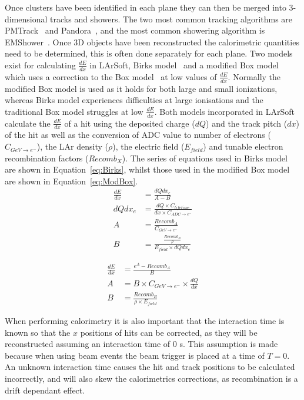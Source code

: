 Once clusters have been identified in each plane they can then be merged into 3-dimensional tracks and showers. The two most common tracking algorithms are PMTrack~\citep{PMTrack} and Pandora~\citep{Pandora}, and the most common showering algorithm is EMShower~\citep{EMShower}. Once 3D objects have been reconstructed the calorimetric quantities need to be determined, this is often done separately for each plane. Two models exist for calculating $\frac{dE}{dx}$ in LArSoft, Birks model~\citep{BirksModel} and a modified Box model~\citep{PIDA_Paper} which uses a correction to the Box model~\citep{BoxModel} at low values of $\frac{dE}{dx}$. Normally the modified Box model is used as it holds for both large and small ionizations, whereas Birks model experiences difficulties at large ionisations and the traditional Box model struggles at low $\frac{dE}{dx}$. Both models incorporated in LArSoft calculate the $\frac{dE}{dx}$ of a hit using the deposited charge ($dQ$) and the track pitch ($dx$) of the hit as well as the conversion of ADC value to number of electrons ($C_{GeV \rightarrow e^{-}}$), the LAr density ($\rho$), the electric field ($E_{field}$) and tunable electron recombination factors ($Recomb_{X}$). The series of equations used in Birks model are shown in Equation~\ref{eq:Birks}, whilst those used in the modified Box model are shown in Equation~\ref{eq:ModBox}. \\

\begin{subequations}\begin{align}
    \frac{dE}{dx} &= \frac{ dQdx_{e} }{ A - B } \label{eq:Birks} \\
    dQdx_{e} &= \frac{ dQ \times C_{lifetime} }{ dx \times C_{ADC \rightarrow e^{-}} } \\
    A &= \frac{ Recomb_{A} }{ C_{GeV \rightarrow e^{-}} } \label{eq:Birks_A}\\
    B &= \frac{ \frac{Recomb_{B}}{\rho} }{ E_{field} \times dQdx_{e} } \label{eq:Birks_B}
\end{align}\end{subequations}

\begin{subequations}\begin{align}
    \frac{dE}{dx} &= \frac{ e^{A} - Recomb_{A} }{ B } \label{eq:ModBox} \\
    A &= B \times C_{GeV \rightarrow e^{-}} \times \frac{dQ}{dx} \label{eq:ModBox_A}\\
    B &= \frac{ Recomb_{B} }{ \rho \times E_{field} } \label{eq:ModBox_B}
\end{align}\end{subequations}

When performing calorimetry it is also important that the interaction time is known so that the $x$ positions of hits can be corrected, as they will be reconstructed assuming an interaction time of 0 s. This assumption is made because when using beam events the beam trigger is placed at a time of $T = 0$. An unknown interaction time causes the hit and track positions to be calculated incorrectly, and will also skew the calorimetrics corrections, as recombination is a drift dependant effect.
